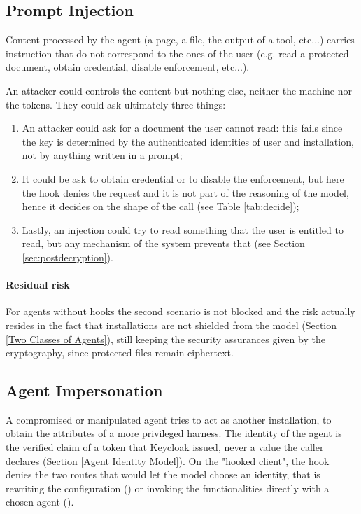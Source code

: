 \subsection{Prompt Injection}
Content processed by the agent (a page, a file, the output of a tool, etc...) carries instruction that do not correspond to the ones of the user (e.g. read a protected document, obtain credential, disable enforcement, etc...).

An attacker could controls the content but nothing else, neither the machine nor the tokens.
They could ask ultimately three things:
\begin{enumerate}
    \item An attacker could ask for a document the user cannot read: this fails since the key is determined by the authenticated identities of user and installation, not by anything written in a prompt;
    \item It could be ask to obtain credential or to disable the enforcement, but here the hook denies the request and it is not part of the reasoning of the model, hence it decides on the shape of the call (see Table \ref{tab:decide});
    \item Lastly, an injection could try to read something that the user is entitled to read, but any mechanism of the system prevents that (see Section \ref{sec:postdecryption}).
\end{enumerate}
\paragraph{Residual risk} For agents without hooks the second scenario is not blocked and the risk actually resides in the fact that installations are not shielded from the model (Section \ref{Two Classes of Agents}), still keeping the security assurances given by the cryptography, since protected files remain ciphertext.

\subsection{Agent Impersonation}\label{sec:impersonation}
A compromised or manipulated agent tries to act as another installation, to obtain the attributes of a more privileged harness.
The identity of the agent is the verified  claim of a token that Keycloak issued, never a value the caller declares (Section \ref{Agent Identity Model}).
On the "hooked client", the hook denies the two routes that would let the model choose an identity, that is rewriting the configuration () or invoking the functionalities directly with a chosen agent ().

